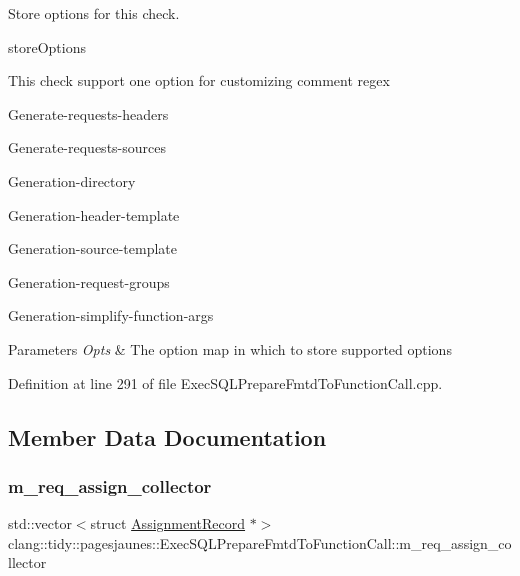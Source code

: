Store options for this check. 

store\+Options

This check support one option for customizing comment regex
\begin{DoxyItemize}
\item Generate-\/requests-\/headers
\item Generate-\/requests-\/sources
\item Generation-\/directory
\item Generation-\/header-\/template
\item Generation-\/source-\/template
\item Generation-\/request-\/groups
\item Generation-\/simplify-\/function-\/args
\end{DoxyItemize}


\begin{DoxyParams}{Parameters}
{\em Opts} & The option map in which to store supported options \\
\hline
\end{DoxyParams}


Definition at line 291 of file Exec\+S\+Q\+L\+Prepare\+Fmtd\+To\+Function\+Call.\+cpp.



\subsection{Member Data Documentation}
\mbox{\label{classclang_1_1tidy_1_1pagesjaunes_1_1_exec_s_q_l_prepare_fmtd_to_function_call_a1a07a6d793e91f3d8ae9c841b0bc15ae}} 
\subsubsection{\texorpdfstring{m\+\_\+req\+\_\+assign\+\_\+collector}{m\_req\_assign\_collector}}
{\footnotesize\ttfamily std\+::vector$<$struct \hyperlink{structclang_1_1tidy_1_1pagesjaunes_1_1_exec_s_q_l_prepare_fmtd_to_function_call_1_1_assignment_record}{Assignment\+Record} $\ast$$>$ clang\+::tidy\+::pagesjaunes\+::\+Exec\+S\+Q\+L\+Prepare\+Fmtd\+To\+Function\+Call\+::m\+\_\+req\+\_\+assign\+\_\+collector\hspace{0.3cm}{\ttfamily [protected]}}



